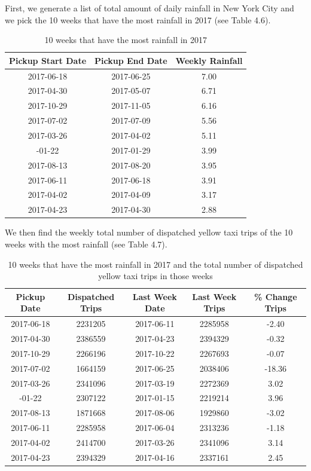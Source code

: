 \documentclass[12pt,twoside]{reedthesis}
\theoremstyle{definition}
\theoremstyle{definition}
\theoremstyle{definition}
\theoremstyle{remark}
\begin{document}
First, we generate a list of total amount of daily rainfall in New York
City and we pick the 10 weeks that have the most rainfall in 2017 (see
Table 4.6).
\begin{table}

\caption{\label{tab:unnamed-chunk-73}10 weeks that have the most rainfall in 2017}
\centering
\begin{tabular}[t]{ccc}
\toprule
Pickup Start Date & Pickup End Date & Weekly Rainfall\\
\midrule
2017-06-18 & 2017-06-25 & 7.00\\
2017-04-30 & 2017-05-07 & 6.71\\
2017-10-29 & 2017-11-05 & 6.16\\
2017-07-02 & 2017-07-09 & 5.56\\
2017-03-26 & 2017-04-02 & 5.11\\
\addlinespace
2017-01-22 & 2017-01-29 & 3.99\\
2017-08-13 & 2017-08-20 & 3.95\\
2017-06-11 & 2017-06-18 & 3.91\\
2017-04-02 & 2017-04-09 & 3.17\\
2017-04-23 & 2017-04-30 & 2.88\\
\bottomrule
\end{tabular}
\end{table}
We then find the weekly total number of dispatched yellow taxi trips of
the 10 weeks with the most rainfall (see Table 4.7).
\begin{table}

\caption{\label{tab:unnamed-chunk-75}10 weeks that have the most rainfall in 2017 and the total number of dispatched yellow taxi trips in those weeks}
\centering
\begin{tabular}[t]{ccccc}
\toprule
Pickup Date & Dispatched Trips & Last Week Date & Last Week Trips & \% Change Trips\\
\midrule
2017-06-18 & 2231205 & 2017-06-11 & 2285958 & -2.40\\
2017-04-30 & 2386559 & 2017-04-23 & 2394329 & -0.32\\
2017-10-29 & 2266196 & 2017-10-22 & 2267693 & -0.07\\
2017-07-02 & 1664159 & 2017-06-25 & 2038406 & -18.36\\
2017-03-26 & 2341096 & 2017-03-19 & 2272369 & 3.02\\
\addlinespace
2017-01-22 & 2307122 & 2017-01-15 & 2219214 & 3.96\\
2017-08-13 & 1871668 & 2017-08-06 & 1929860 & -3.02\\
2017-06-11 & 2285958 & 2017-06-04 & 2313236 & -1.18\\
2017-04-02 & 2414700 & 2017-03-26 & 2341096 & 3.14\\
2017-04-23 & 2394329 & 2017-04-16 & 2337161 & 2.45\\
\bottomrule
\end{tabular}
\end{table}
\end{document}
